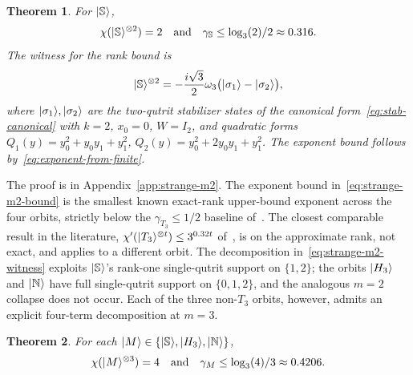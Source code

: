 \documentclass[11pt]{article}
\newtheorem{theorem}{Theorem}
\theoremstyle{definition}
\newcommand{\microspace}{\mspace{0.5mu}}
\newcommand{\ket}[1]{\lvert\microspace #1 \microspace \rangle}
\newcommand{\chiR}{\chi}
\newcommand{\Strange}{\ket{\mathbb{S}}}
\newcommand{\Hth}{\ket{H_3}}
\newcommand{\Norrell}{\ket{\mathbb{N}}}
\newcommand{\Tth}{\ket{T_3}}
\newcommand{\omegath}{\omega_3}
\begin{document}
	\begin{theorem}\label{thm:strange-m2}
		For $\Strange$,
		\begin{equation}\label{eq:strange-m2-bound}
			\chiR(\Strange^{\otimes 2}) = 2
			\quad\text{and}\quad
			\gamma_{\mathbb{S}} \le \log_3(2)/2 \approx 0.316.
		\end{equation}
		The witness for the rank bound is
		\begin{equation}\label{eq:strange-m2-witness}
			\Strange^{\otimes 2}
			= -\frac{i \sqrt{3}}{2} \omegath
			\big( \ket{\sigma_1} - \ket{\sigma_2} \big),
		\end{equation}
		where $\ket{\sigma_1}, \ket{\sigma_2}$ are the two-qutrit stabilizer
		states of the canonical form~\eqref{eq:stab-canonical} with $k = 2$,
		$x_0 = 0$, $W = I_2$, and quadratic forms
		$Q_1(y) = y_0^2 + y_0 y_1 + y_1^2$,
		$Q_2(y) = y_0^2 + 2 y_0 y_1 + y_1^2$. The exponent bound follows
		by~\eqref{eq:exponent-from-finite}.
	\end{theorem}
	
	The proof is in Appendix~\ref{app:strange-m2}. The exponent bound
	in~\eqref{eq:strange-m2-bound} is the smallest known exact-rank
	upper-bound exponent across the four orbits, strictly below the
	$\gamma_{T_3} \le 1/2$ baseline of~\cite{kocia2021improved}. The closest comparable result in the
	literature, $\chi'(\Tth^{\otimes t}) \le 3^{0.32 t}$
	of~\cite{huang2019approximate}, is on the approximate rank, not
	exact, and applies to a different orbit.
	The decomposition in~\eqref{eq:strange-m2-witness} exploits
	$\Strange$'s rank-one single-qutrit support on $\{1, 2\}$; the
	orbits $\Hth$ and $\Norrell$ have full single-qutrit support on
	$\{0, 1, 2\}$, and the analogous $m = 2$ collapse does not occur.
	Each of the three non-$T_3$ orbits, however, admits an explicit
	four-term decomposition at $m = 3$.
	
	\begin{theorem}\label{thm:m3-bound}
		For each $\ket M \in \{\Strange, \Hth, \Norrell\}$,
		\begin{equation}\label{eq:m3-bound}
			\chiR(\ket M^{\otimes 3}) = 4
			\quad\text{and}\quad
			\gamma_M \le \log_3(4)/3 \approx 0.4206.
		\end{equation}
	\end{theorem}
	
\end{document}
